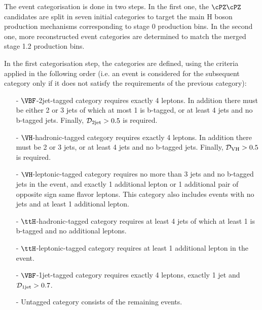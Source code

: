The event categorisation is done in two steps.
In the first one, the $\cPZ\cPZ$ candidates are split in seven initial categories to target the main H boson production mechanisms corresponding to stage 0 production bins.
In the second one, more reconstructed event categories are determined to match the merged stage 1.2 production bins.

In the first categorisation step, the categories are defined, using the criteria applied in the following order (i.e. an event is considered for the subsequent category only if it does not satisfy the requirements of the previous category):
%
\begin{itemize}
\item[-] {$\VBF$-2jet-tagged} category requires exactly 4 leptons. In addition there must be either 2 or 3 jets
of which at most 1 is b-tagged, or at least 4 jets and no b-tagged jets. Finally, ${\cal D}_{\rm 2jet}>0.5$ is required.
\item[-] {$\VH$-hadronic-tagged} category requires exactly 4 leptons. In addition there must be 2 or 3 jets,
or at least 4 jets and no b-tagged jets. Finally, ${\cal D}_{\rm VH} > 0.5$ is required.
\item[-] {$\VH$-leptonic-tagged} category requires no more than 3 jets and no b-tagged jets in the event,
and exactly 1 additional lepton or 1 additional pair of opposite sign same flavor leptons. This category also includes events
with no jets and at least 1 additional lepton.
\item[-] {$\ttH$-hadronic-tagged} category requires at least 4 jets of which at least 1 is b-tagged and no additional leptons.
\item[-] {$\ttH$-leptonic-tagged} category requires at least 1 additional lepton in the event.
\item[-] {$\VBF$-1jet-tagged} category requires exactly 4 leptons, exactly 1 jet and ${\cal D}_{\rm 1jet}>0.7$.
\item[-] {Untagged} category consists of the remaining events.
\end{itemize}

